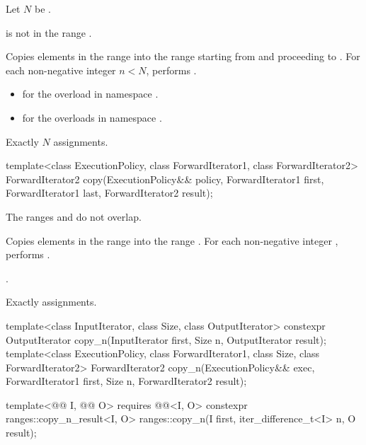 \begin{itemdescr}
\pnum
Let $N$ be .

\pnum
\expects
{} is not in the range .

\pnum
\effects
Copies elements in the range 
into the range 
starting from  and proceeding to .
For each non-negative integer $n < N$,
performs .

\pnum
\returns
\begin{itemize}
\item
   for the overload in namespace .
\item
   for the overloads in namespace .
\end{itemize}

\pnum
\complexity
Exactly $N$ assignments.
\end{itemdescr}

%
\begin{itemdecl}
template<class ExecutionPolicy, class ForwardIterator1, class ForwardIterator2>
  ForwardIterator2 copy(ExecutionPolicy&& policy,
                        ForwardIterator1 first, ForwardIterator1 last,
                        ForwardIterator2 result);
\end{itemdecl}

\begin{itemdescr}
\pnum
\expects
The ranges  and 
do not overlap.

\pnum
\effects
Copies elements in the range 
into the range .
For each non-negative integer ,
performs .

\pnum
\returns
{}.

\pnum
\complexity
Exactly  assignments.
\end{itemdescr}

%
\begin{itemdecl}
template<class InputIterator, class Size, class OutputIterator>
  constexpr OutputIterator copy_n(InputIterator first, Size n,
                                  OutputIterator result);
template<class ExecutionPolicy, class ForwardIterator1, class Size, class ForwardIterator2>
  ForwardIterator2 copy_n(ExecutionPolicy&& exec,
                          ForwardIterator1 first, Size n,
                          ForwardIterator2 result);

template<@@ I, @@ O>
  requires @@<I, O>
  constexpr ranges::copy_n_result<I, O>
    ranges::copy_n(I first, iter_difference_t<I> n, O result);
\end{itemdecl}

